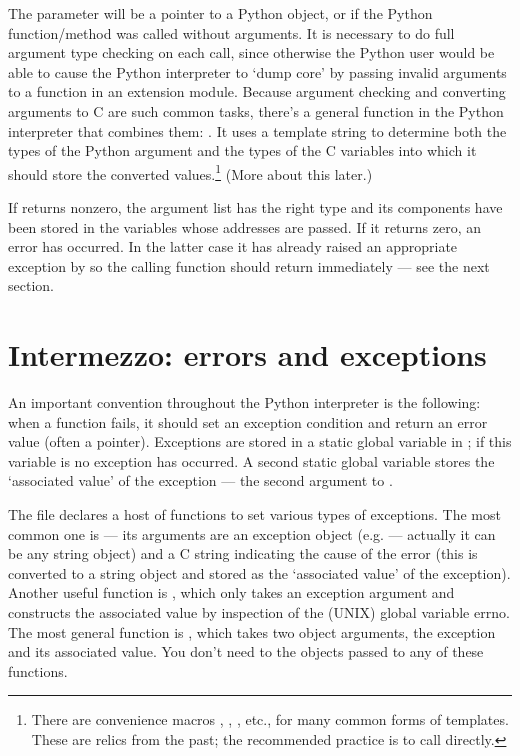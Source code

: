 The  parameter will be a pointer to a Python object, or
 if the Python function/method was called without
arguments.  It is necessary to do full argument type checking on each
call, since otherwise the Python user would be able to cause the
Python interpreter to `dump core' by passing invalid arguments to a
function in an extension module.  Because argument checking and
converting arguments to C are such common tasks, there's a general
function in the Python interpreter that combines them:
.  It uses a template string to determine both the
types of the Python argument and the types of the C variables into
which it should store the converted values.\footnote{There are
convenience macros , ,
, etc., for many common forms of 
templates.  These are relics from the past; the recommended practice
is to call  directly.}  (More about this later.)

If  returns nonzero, the argument list has the right
type and its components have been stored in the variables whose
addresses are passed.  If it returns zero, an error has occurred.  In
the latter case it has already raised an appropriate exception by so
the calling function should return  immediately --- see the
next section.


\section{Intermezzo: errors and exceptions}

An important convention throughout the Python interpreter is the
following: when a function fails, it should set an exception condition
and return an error value (often a  pointer).  Exceptions
are stored in a static global variable in ; if
this variable is  no exception has occurred.  A second
static global variable stores the `associated value' of the exception
--- the second argument to .

The file  declares a host of functions to set various
types of exceptions.  The most common one is  ---
its arguments are an exception object (e.g.  ---
actually it can be any string object) and a C string indicating the
cause of the error (this is converted to a string object and stored as
the `associated value' of the exception).  Another useful function is
, which only takes an exception argument and
constructs the associated value by inspection of the (UNIX) global
variable errno.  The most general function is , which
takes two object arguments, the exception and its associated value.
You don't need to  the objects passed to any of these
functions.

